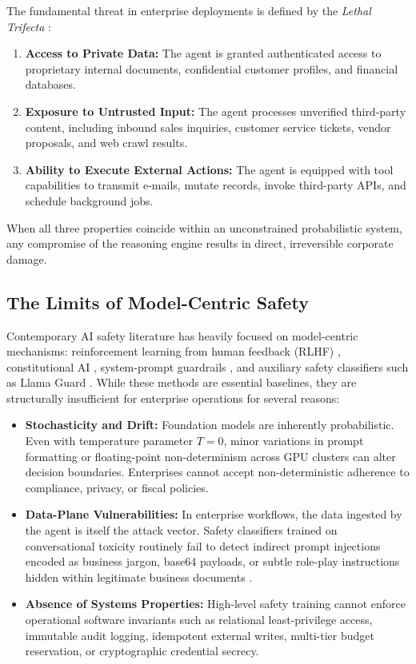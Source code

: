 \documentclass[10pt,a4paper,twocolumn]{article}
\begin{document}
The fundamental threat in enterprise deployments is defined by the \emph{Lethal Trifecta} \cite{willison2025trifecta}:
\begin{enumerate}[leftmargin=*]
  \item \textbf{Access to Private Data:} The agent is granted authenticated access to proprietary internal documents, confidential customer profiles, and financial databases.
  \item \textbf{Exposure to Untrusted Input:} The agent processes unverified third-party content, including inbound sales inquiries, customer service tickets, vendor proposals, and web crawl results.
  \item \textbf{Ability to Execute External Actions:} The agent is equipped with tool capabilities to transmit e-mails, mutate records, invoke third-party APIs, and schedule background jobs.
\end{enumerate}
When all three properties coincide within an unconstrained probabilistic system, any compromise of the reasoning engine results in direct, irreversible corporate damage.

\subsection{The Limits of Model-Centric Safety}
Contemporary AI safety literature has heavily focused on model-centric mechanisms: reinforcement learning from human feedback (RLHF) \cite{ouyang2022instructgpt}, constitutional AI \cite{bai2022constitutional}, system-prompt guardrails \cite{rebedea2023nemo}, and auxiliary safety classifiers such as Llama Guard \cite{inan2023llamaguard}. While these methods are essential baselines, they are structurally insufficient for enterprise operations for several reasons:
\begin{itemize}[leftmargin=*]
  \item \textbf{Stochasticity and Drift:} Foundation models are inherently probabilistic. Even with temperature parameter $T=0$, minor variations in prompt formatting or floating-point non-determinism across GPU clusters can alter decision boundaries. Enterprises cannot accept non-deterministic adherence to compliance, privacy, or fiscal policies.
  \item \textbf{Data-Plane Vulnerabilities:} In enterprise workflows, the data ingested by the agent is itself the attack vector. Safety classifiers trained on conversational toxicity routinely fail to detect indirect prompt injections encoded as business jargon, base64 payloads, or subtle role-play instructions hidden within legitimate business documents \cite{debenedetti2024agentdojo,zou2023universal}.
  \item \textbf{Absence of Systems Properties:} High-level safety training cannot enforce operational software invariants such as relational least-privilege access, immutable audit logging, idempotent external writes, multi-tier budget reservation, or cryptographic credential secrecy.
\end{itemize}
\end{document}
